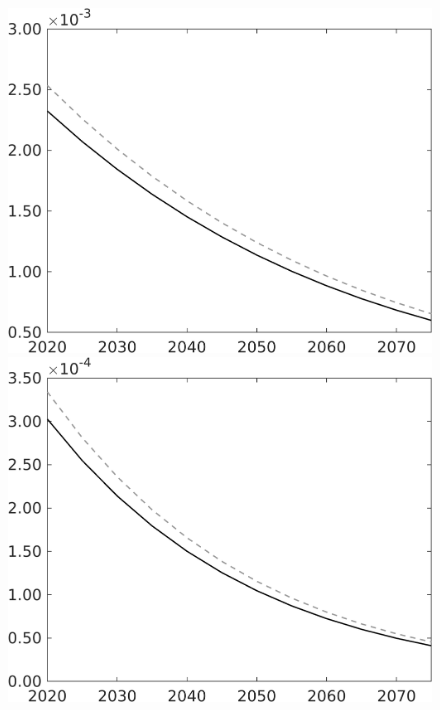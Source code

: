 \documentclass[12pt]{article}
\begin{document}
\begin{figure}[h!!]
\begin{minipage}[]{0.32\textwidth}
\end{minipage}	
	\begin{minipage}[]{0.32\textwidth}
		\includegraphics[width=1\textwidth]{../../codding_model/own_basedOnFried/optimalPol_010922_revision/figures/all_13Sept22/CompTaul_LFBAU_Reg0_Lf_spillover0_nsk0_xgr1_knspil1_sep1_countec0_GovRev0_etaa0.79_lgd0.png}
	\end{minipage}	
	\begin{minipage}[]{0.32\textwidth}
		\includegraphics[width=1\textwidth]{../../codding_model/own_basedOnFried/optimalPol_010922_revision/figures/all_13Sept22/CompTaul_LFBAU_Reg0_Lg_spillover0_nsk0_xgr1_knspil1_sep1_countec0_GovRev0_etaa0.79_lgd0.png}

\end{minipage}
\end{figure}
\end{document}
